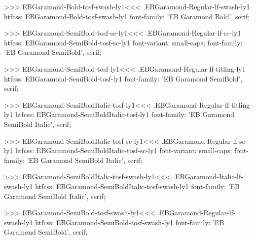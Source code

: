 {{>>>
\<EBGaramond-Bold-tosf-swash-ly1\><<<
.EBGaramond-Regular-lf-swash-ly1
htfcss:  EBGaramond-Bold-tosf-swash-ly1  font-family: 'EB Garamond Bold', serif;

>>>
\<EBGaramond-SemiBold-tosf-sc-ly1\><<<
.EBGaramond-Regular-lf-sc-ly1
htfcss:  EBGaramond-SemiBold-tosf-sc-ly1  font-variant: small-caps; font-family: 'EB Garamond SemiBold', serif;

>>>
\<EBGaramond-SemiBold-tosf-ly1\><<<
.EBGaramond-Regular-lf-titling-ly1
htfcss:  EBGaramond-SemiBold-tosf-ly1  font-family: 'EB Garamond SemiBold', serif;

>>>
\<EBGaramond-SemiBoldItalic-tosf-ly1\><<<
.EBGaramond-Regular-lf-titling-ly1
htfcss:  EBGaramond-SemiBoldItalic-tosf-ly1  font-family: 'EB Garamond SemiBold Italic', serif;

>>>
\<EBGaramond-SemiBoldItalic-tosf-sc-ly1\><<<
.EBGaramond-Regular-lf-sc-ly1
htfcss:  EBGaramond-SemiBoldItalic-tosf-sc-ly1  font-variant: small-caps; font-family: 'EB Garamond SemiBold Italic', serif;

>>>
\<EBGaramond-SemiBoldItalic-tosf-swash-ly1\><<<
.EBGaramond-Italic-lf-swash-ly1
htfcss:  EBGaramond-SemiBoldItalic-tosf-swash-ly1  font-family: 'EB Garamond SemiBold Italic', serif;

>>>
\<EBGaramond-SemiBold-tosf-swash-ly1\><<<
.EBGaramond-Regular-lf-swash-ly1
htfcss:  EBGaramond-SemiBold-tosf-swash-ly1  font-family: 'EB Garamond SemiBold', serif;

}}
